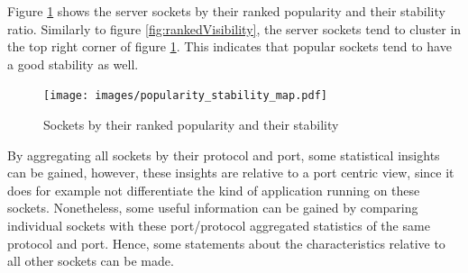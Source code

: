 Figure \ref{fig:rankedPopularity} shows the \glspl{server socket} by their ranked popularity and their stability ratio. 
Similarly to figure \ref{fig:rankedVisibility}, the \glspl{server socket} tend to cluster in the top right corner of figure \ref{fig:rankedPopularity}. This indicates that popular sockets tend to have a good stability as well. 
\begin{figure}
	[ht] \centering 
	\texttt{[image: images/popularity\_stability\_map.pdf]} \caption{Sockets by their ranked popularity and their stability} 
	\label{fig:rankedPopularity} 
\end{figure}

By aggregating all sockets by their protocol and port, some statistical insights can be gained, however, these insights are relative to a port centric view, since it does for example not differentiate the kind of application running on these sockets. 
Nonetheless, some useful information can be gained by comparing individual sockets with these port/protocol aggregated statistics of the same protocol and port. 
Hence, some statements about the characteristics relative to all other sockets can be made.

